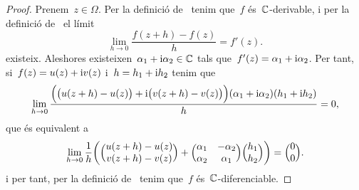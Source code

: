 \documentclass[../Apunts.tex]{subfiles}
\begin{document}
	\begin{proof}
		Prenem~\(z\in\Omega\).
		Per la definició de~ tenim que~\(f\)
		és~\(\mathbb{C}\)-derivable, i per la definició de~
		el límit
		\begin{equation*}
			\lim_{h\to0}\frac{f(z+h)-f(z)}{h} = f'(z).
		\end{equation*}
		existeix.
		Aleshores existeixen~\(\alpha_{1}+\mathrm{i}\alpha_{2}\in\mathbb{C}\) tals
		que~\(f'(z)=\alpha_{1}+\mathrm{i}\alpha_{2}\).
		Per tant, si~\(f(z)=u(z)+\mathrm{i} v(z)\) i~\(h=h_{1}+\mathrm{i} h_{2}\) tenim que
		\begin{equation*}
			\lim_{h\to0}\frac{\Bigl(\bigl(u(z+h)-u(z)\bigr)
			+\mathrm{i}\bigl(v(z+h)-v(z)\bigr)\Bigr)(\alpha_{1}+\mathrm{i}\alpha_{2})
			(h_{1}+\mathrm{i} h_{2})}{h} = 0,
		\end{equation*}
		que és equivalent a
		\begin{equation*}
			\lim_{h\to0}\frac{1}{h}\biggl(\Bigl(\begin{matrix}
				u(z+h)-u(z) \\
				v(z+h)-v(z)
			\end{matrix}
			\Bigr)+\Bigl(\begin{matrix}
				\alpha_{1} & -\alpha_{2} \\
				\alpha_{2} & \alpha_{1}
			\end{matrix}\Bigr)\Bigl(\begin{matrix}
				h_{1} \\
				h_{2}
			\end{matrix}\Bigr)\biggr)
			=\Bigl(\begin{matrix}
				0 \\
				0
			\end{matrix}\Bigr).
		\end{equation*}
		i per tant, per la definició de~ tenim que~\(f\) és~\(\mathbb{C}\)-diferenciable.
	\end{proof}
\end{document}
